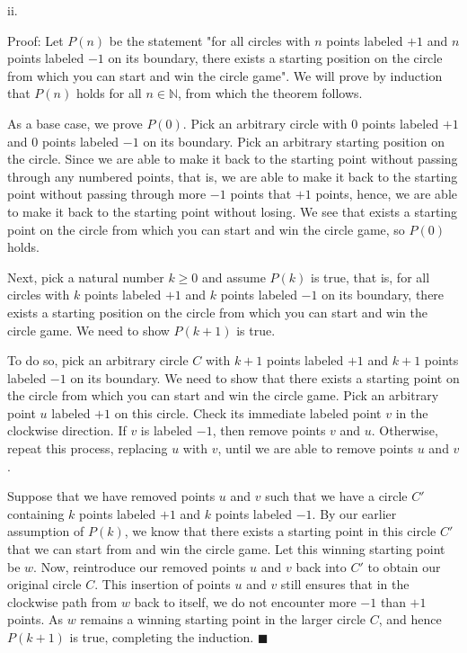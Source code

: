 \documentclass{article}
\renewcommand{\(}{\left(}
\renewcommand{\)}{\right)}
\renewcommand\qedsymbol{$\blacksquare$}
\theoremstyle{plain}
\theoremstyle{plain}
\theoremstyle{definition}
\begin{document}
    ii.
    \begin{shaded}
        Proof: Let $P(n)$ be the statement "for all circles with $n$ points labeled $+1$ and $n$ points labeled $-1$ on its boundary, there exists a starting position on the circle from which you can start and win the circle game". We will prove by induction that $P(n)$ holds for all $n\in\mathbb{N}$, from which the theorem follows.

        \vspace{4mm}

        As a base case, we prove $P(0)$. Pick an arbitrary circle with $0$ points labeled $+1$ and 0 points labeled $-1$ on its boundary. Pick an arbitrary starting position on the circle. Since we are able to make it back to the starting point without passing through any numbered points, that is, we are able to make it back to the starting point without passing through more $-1$ points that $+1$ points, hence, we are able to make it back to the starting point without losing. We see that exists a starting point on the circle from which you can start and win the circle game, so $P(0)$ holds.

        \vspace{4mm}

        Next, pick a natural number $k\geq 0$ and assume $P(k)$ is true, that is, for all circles with $k$ points labeled $+1$ and $k$ points labeled $-1$ on its boundary, there exists a starting position on the circle from which you can start and win the circle game. We need to show $P(k+1)$ is true.

        \vspace{4mm}

        To do so, pick an arbitrary circle $C$ with $k+1$ points labeled $+1$ and $k+1$ points labeled $-1$ on its boundary. We need to show that there exists a starting point on the circle from which you can start and win the circle game. Pick an arbitrary point $u$ labeled $+1$ on this circle. Check its immediate labeled point $v$ in the clockwise direction. If $v$ is labeled $-1$, then remove points $v$ and $u$. Otherwise, repeat this process, replacing $u$ with $v$, until we are able to remove points $u$ and $v$.

        \vspace{4mm}

        Suppose that we have removed points $u$ and $v$ such that we have a circle $C'$ containing $k$ points labeled $+1$ and $k$ points labeled $-1$. By our earlier assumption of $P(k)$, we know that there exists a starting point in this circle $C'$ that we can start from and win the circle game. Let this winning starting point be $w$. Now, reintroduce our removed points $u$ and $v$ back into $C'$ to obtain our original circle $C$. This insertion of points $u$ and $v$ still ensures that in the clockwise path from $w$ back to itself, we do not encounter more $-1$ than $+1$ points. As $w$ remains a winning starting point in the larger circle $C$, and hence $P(k+1)$ is true, completing the induction. \qedsymbol
    \end{shaded}
    
\end{document}
